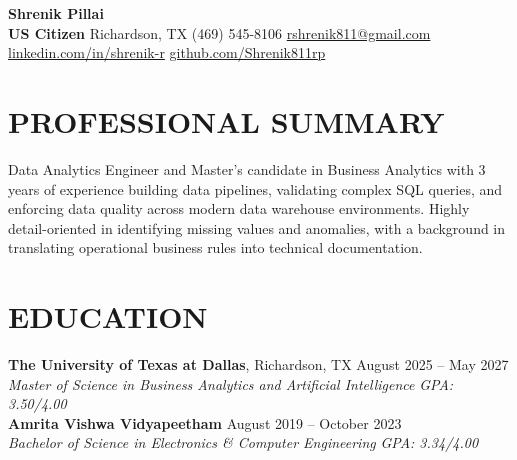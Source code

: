 \documentclass[11pt,letterpaper]{article}
\begin{document}
\begin{center}
{\LARGE \textbf{Shrenik Pillai}} \\ \vspace{2pt}
\textbf{US Citizen} \quad \small Richardson, TX \quad (469) 545-8106 \quad \href{mailto:rshrenik811@gmail.com}{rshrenik811@gmail.com} \quad \href{https://linkedin.com/in/shrenik-r}{linkedin.com/in/shrenik-r} \quad \href{https://github.com/Shrenik811rp}{github.com/Shrenik811rp}
\end{center}
\section*{PROFESSIONAL SUMMARY}
\noindent\small Data Analytics Engineer and Master's candidate in Business Analytics with 3 years of experience building data pipelines, validating complex SQL queries, and enforcing data quality across modern data warehouse environments. Highly detail-oriented in identifying missing values and anomalies, with a background in translating operational business rules into technical documentation.
\section*{EDUCATION}
\noindent\small \textbf{The University of Texas at Dallas}, Richardson, TX \hfill August 2025 -- May 2027 \\
\textit{Master of Science in Business Analytics and Artificial Intelligence} \hfill \textit{GPA: 3.50/4.00} \\
\noindent\small \textbf{Amrita Vishwa Vidyapeetham} \hfill August 2019 -- October 2023 \\
\textit{Bachelor of Science in Electronics \& Computer Engineering} \hfill \textit{GPA: 3.34/4.00}
\end{document}
